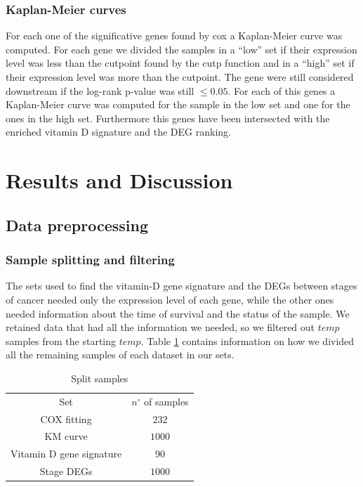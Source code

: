 \documentclass[fleqn,10pt]{SelfArx} %
\begin{document}
		\subsubsection{Kaplan-Meier curves}
			For each one of the significative genes found by cox a Kaplan-Meier curve was computed.
			For each gene we divided the samples in a ``low'' set if their expression level was less than the cutpoint found by the cutp function and in a ``high'' set if their expression level was more than the cutpoint.
			The gene were still considered downstream if the log-rank p-value was still $\le0.05$.
			For each of this genes a Kaplan-Meier curve was computed for the sample in the low set and one for the ones in the high set.
			Furthermore this genes have been intersected with the enriched vitamin D signature and the DEG ranking.


\section{Results and Discussion}
	\subsection{Data preprocessing} %
		\subsubsection{Sample splitting and filtering}
			The sets used to find the vitamin-D gene signature and the DEGs between stages of cancer needed only the expression level of each gene, while the other ones needed information about the time of survival and the status of the sample.
			We retained data that had all the information we needed, so we filtered out $temp$ samples from the starting $temp$.
			Table \ref{tab:samples_split} contains information on how we divided all the remaining samples of each dataset in our sets.

			\begin{table}[H]
				\centering
				\begin{tabular}{cc}
					\hline
					Set & $n^\circ$ of samples\\
					COX fitting & $232$\\
					KM curve & $1000$\\
					Vitamin D gene signature & $90$\\
					Stage DEGs & $1000$\\
					\hline
				\end{tabular}
				\caption{Split samples}
				\label{tab:samples_split}
			\end{table}
\end{document}
